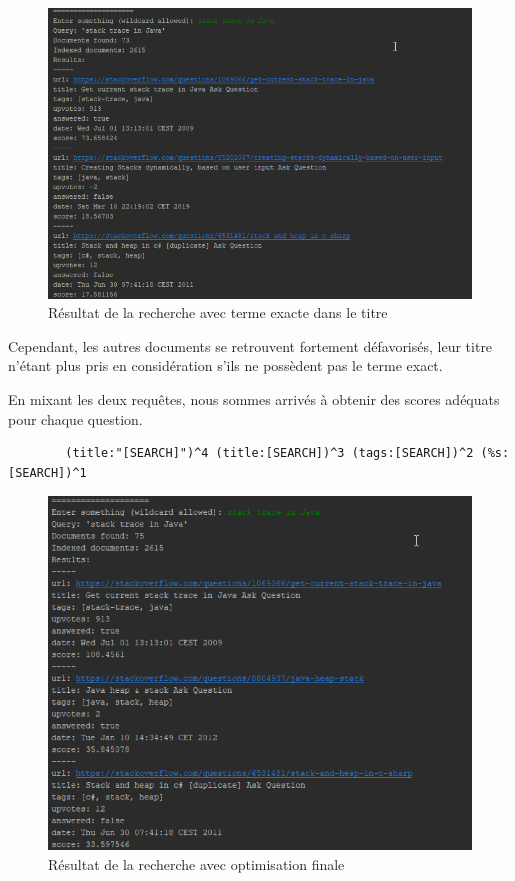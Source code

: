 \documentclass[a4paper]{article}
\begin{document}
	\begin{figure}[H]
		\centering
		\includegraphics[width=\columnwidth]{images/04-search-02.png}
		\caption{Résultat de la recherche avec terme exacte dans le titre}
	\end{figure}

	Cependant, les autres documents se retrouvent fortement défavorisés,
	leur titre n'étant plus pris en considération s'ils ne possèdent pas le terme exact.

	En mixant les deux requêtes, nous sommes arrivés à obtenir des scores adéquats pour chaque question.
	
	\begin{verbatim} 
		(title:"[SEARCH]")^4 (title:[SEARCH])^3 (tags:[SEARCH])^2 (%s:[SEARCH])^1
	\end{verbatim}

	\begin{figure}[H]
		\centering
		\includegraphics[width=\columnwidth]{images/05-search-03.png}
		\caption{Résultat de la recherche avec optimisation finale}
	\end{figure}
\end{document}
